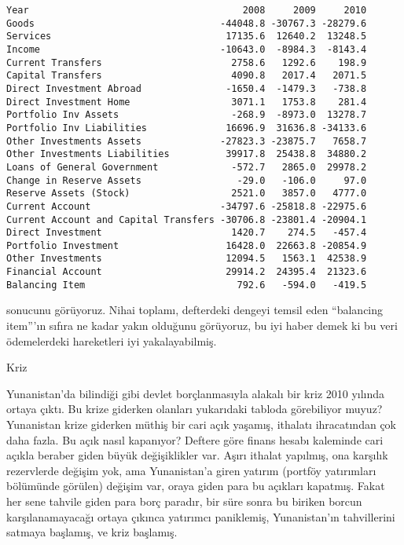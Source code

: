 \documentclass[12pt,fleqn]{article}\usepackage{../../common}
\begin{document}
\begin{verbatim}
Year                                      2008     2009     2010
Goods                                 -44048.8 -30767.3 -28279.6
Services                               17135.6  12640.2  13248.5
Income                                -10643.0  -8984.3  -8143.4
Current Transfers                       2758.6   1292.6    198.9
Capital Transfers                       4090.8   2017.4   2071.5
Direct Investment Abroad               -1650.4  -1479.3   -738.8
Direct Investment Home                  3071.1   1753.8    281.4
Portfolio Inv Assets                    -268.9  -8973.0  13278.7
Portfolio Inv Liabilities              16696.9  31636.8 -34133.6
Other Investments Assets              -27823.3 -23875.7   7658.7
Other Investments Liabilities          39917.8  25438.8  34880.2
Loans of General Government             -572.7   2865.0  29978.2
Change in Reserve Assets                 -29.0   -106.0     97.0
Reserve Assets (Stock)                  2521.0   3857.0   4777.0
Current Account                       -34797.6 -25818.8 -22975.6
Current Account and Capital Transfers -30706.8 -23801.4 -20904.1
Direct Investment                       1420.7    274.5   -457.4
Portfolio Investment                   16428.0  22663.8 -20854.9
Other Investments                      12094.5   1563.1  42538.9
Financial Account                      29914.2  24395.4  21323.6
Balancing Item                           792.6   -594.0   -419.5
\end{verbatim}

sonucunu görüyoruz. Nihai toplamı, defterdeki dengeyi temsil eden
``balancing item'''ın sıfıra ne kadar yakın olduğunu görüyoruz, bu iyi
haber demek ki bu veri ödemelerdeki hareketleri iyi yakalayabilmiş. 

Kriz

Yunanistan'da bilindiği gibi devlet borçlanmasıyla alakalı bir kriz 2010
yılında ortaya çıktı. Bu krize giderken olanları yukarıdaki tabloda
görebiliyor muyuz?  Yunanistan krize giderken müthiş bir cari açık yaşamış,
ithalatı ihracatından çok daha fazla. Bu açık nasıl kapanıyor? Deftere göre
finans hesabı kaleminde cari açıkla beraber giden büyük değişiklikler
var. Aşırı ithalat yapılmış, ona karşılık rezervlerde değişim yok, ama
Yunanistan'a giren yatırım (portföy yatırımları bölümünde görülen) değişim
var, oraya giden para bu açıkları kapatmış. Fakat her sene tahvile giden
para borç paradır, bir süre sonra bu biriken borcun karşılanamayacağı
ortaya çıkınca yatırımcı paniklemiş, Yunanistan'ın tahvillerini satmaya
başlamış, ve kriz başlamış.
\end{document}
